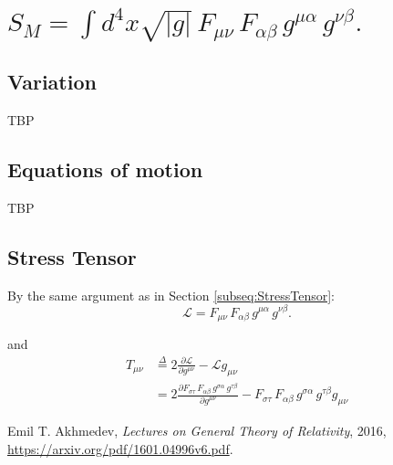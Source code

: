 \documentclass[]{article}
\newcommand{\Lagr}{\mathscr{L}}
\begin{document}
\section{$S_M = \int d^4x \sqrt{|g|} \, F_{\mu\nu}\, F_{\alpha\beta} \, g^{\mu\alpha} \, g^{\nu\beta}.$}
\subsection{Variation}
TBP
\subsection{Equations of motion}
TBP
\subsection{Stress Tensor}
By the same argument as in Section \ref{subseq:StressTensor}:
\begin{equation}
\Lagr= F_{\mu\nu}\, F_{\alpha\beta} \, g^{\mu\alpha} \, g^{\nu\beta}.
\label {eq:a}
\end{equation}

and
\begin{align}
T_{\mu\nu}&\overset{\Delta}{=}2 \frac{\partial \Lagr}{\partial g^{\mu\nu}} - \Lagr g_{\mu\nu}\\
&=2\frac{\partial F_{\sigma\tau}\, F_{\alpha\beta} \, g^{\sigma\alpha} \, g^{\tau\beta}}{\partial g^{\mu\nu}} - F_{\sigma\tau}\, F_{\alpha\beta} \, g^{\sigma\alpha} \, g^{\tau\beta} g_{\mu\nu}
\end{align}

\begin{thebibliography}{9}

Emil T. Akhmedev,
\emph{Lectures on General Theory of Relativity},
2016,
\url{https://arxiv.org/pdf/1601.04996v6.pdf}.

\end{thebibliography}
\end{document}
